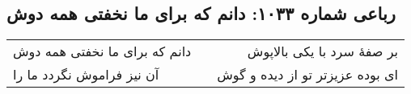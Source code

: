 \begin{center}
\section*{رباعی شماره ۱۰۳۳: دانم که برای ما نخفتی همه دوش}
\label{sec:1033}
\begin{longtable}{l p{0.5cm} r}
دانم که برای ما نخفتی همه دوش
&&
بر صفهٔ سرد با یکی بالاپوش
\\
آن نیز فراموش نگردد ما را
&&
ای بوده عزیزتر تو از دیده و گوش
\\
\end{longtable}
\end{center}
